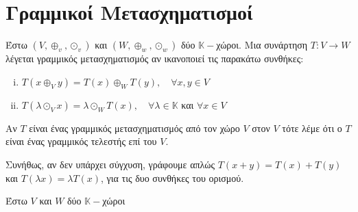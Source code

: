








\chapter{Γραμμικοί Μετασχηματισμοί}

\begin{dfn}
    Έστω $ (V, \oplus _{v}, \odot _{v}) $ και $ (W, \oplus _{w}, \odot _{w}) $ 
    δύο $ \mathbb{K} - $χώροι. Μια συνάρτηση $ T \colon V \to W $ λέγεται 
    \textcolor{Col1}{γραμμικός μετασχηματισμός} αν ικανοποιεί τις παρακάτω συνθήκες:
    \begin{enumerate}[i)]
        \item $ T(x \oplus _{V} y) = T(x) \oplus _{W} T(y), \quad \forall x,y \in V $
        \item $ T(\lambda \odot _{V} x) = \lambda \odot _{W} T(x), \quad \forall \lambda 
            \in \mathbb{K} $ και $ \forall x \in V $
    \end{enumerate}
    Αν $T$ είναι ένας γραμμικός μετασχηματισμός από τον χώρο $V$ στον $V$ τότε λέμε 
    ότι ο $T$ είναι ένας \textcolor{Col1}{γραμμικός τελεστής} επί του $V$. 
\end{dfn}

\begin{rem}
    Συνήθως, αν δεν υπάρχει σύγχυση, γράφουμε απλώς $ T(x+y) = T(x) + T(y) $ και 
    $ T(\lambda x) = \lambda T(x) $, για τις δυο συνθήκες του ορισμού.
\end{rem}

\begin{rem}
    Έστω $ V $ και $W$ δύο $ \mathbb{K}- $χώροι 
\end{rem}




